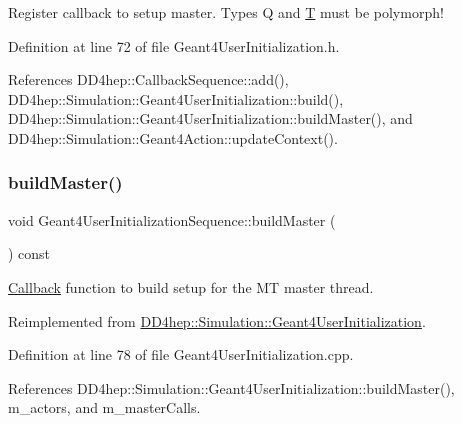 Register callback to setup master. Types Q and \hyperlink{class_t}{T} must be polymorph! 



Definition at line 72 of file Geant4\+User\+Initialization.\+h.



References D\+D4hep\+::\+Callback\+Sequence\+::add(), D\+D4hep\+::\+Simulation\+::\+Geant4\+User\+Initialization\+::build(), D\+D4hep\+::\+Simulation\+::\+Geant4\+User\+Initialization\+::build\+Master(), and D\+D4hep\+::\+Simulation\+::\+Geant4\+Action\+::update\+Context().

\hypertarget{class_d_d4hep_1_1_simulation_1_1_geant4_user_initialization_sequence_a7bcc884bce6a20d73e734777c0c75322}{}\label{class_d_d4hep_1_1_simulation_1_1_geant4_user_initialization_sequence_a7bcc884bce6a20d73e734777c0c75322} 
\subsubsection{\texorpdfstring{build\+Master()}{buildMaster()}\hspace{0.1cm}{\footnotesize\ttfamily [2/2]}}
{\footnotesize\ttfamily void Geant4\+User\+Initialization\+Sequence\+::build\+Master (\begin{DoxyParamCaption}{ }\end{DoxyParamCaption}) const\hspace{0.3cm}{\ttfamily [virtual]}}



\hyperlink{class_d_d4hep_1_1_callback}{Callback} function to build setup for the MT master thread. 



Reimplemented from \hyperlink{class_d_d4hep_1_1_simulation_1_1_geant4_user_initialization_acb13e9e0c314465bcf7680fc9d205b6b}{D\+D4hep\+::\+Simulation\+::\+Geant4\+User\+Initialization}.



Definition at line 78 of file Geant4\+User\+Initialization.\+cpp.



References D\+D4hep\+::\+Simulation\+::\+Geant4\+User\+Initialization\+::build\+Master(), m\+\_\+actors, and m\+\_\+master\+Calls.

